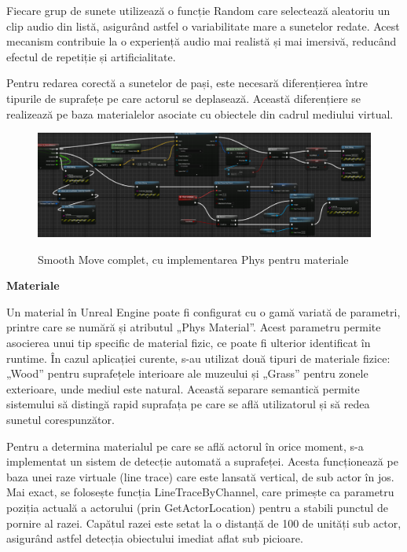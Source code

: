 Fiecare grup de sunete utilizează o funcție Random care selectează aleatoriu un clip audio din listă, asigurând astfel o variabilitate mare a sunetelor redate. Acest mecanism contribuie la o experiență audio mai realistă și mai imersivă, reducând efectul de repetiție și artificialitate.

Pentru redarea corectă a sunetelor de pași, este necesară diferențierea între tipurile de suprafețe pe care actorul se deplasează. Această diferențiere se realizează pe baza materialelor asociate cu obiectele din cadrul mediului virtual.

\begin{figure} [htp] 
\centering 
\includegraphics [width=12cm]
{continut/capitol3/figuri/Smooth_Move_Complex.png} 
\label{fig:VR_Pawn} 
    \caption{Smooth Move complet, cu implementarea Phys pentru materiale}
\end{figure}

\textbf{Materiale}

Un material în Unreal Engine poate fi configurat cu o gamă variată de parametri, printre care se numără și atributul „Phys Material”. Acest parametru permite asocierea unui tip specific de material fizic, ce poate fi ulterior identificat în runtime. În cazul aplicației curente, s-au utilizat două tipuri de materiale fizice: „Wood” pentru suprafețele interioare ale muzeului și „Grass” pentru zonele exterioare, unde mediul este natural. Această separare semantică permite sistemului să distingă rapid suprafața pe care se află utilizatorul și să redea sunetul corespunzător.

Pentru a determina materialul pe care se află actorul în orice moment, s-a implementat un sistem de detecție automată a suprafeței. Acesta funcționează pe baza unei raze virtuale (line trace) care este lansată vertical, de sub actor în jos. Mai exact, se folosește funcția LineTraceByChannel, care primește ca parametru poziția actuală a actorului (prin GetActorLocation) pentru a stabili punctul de pornire al razei. Capătul razei este setat la o distanță de 100 de unități sub actor, asigurând astfel detecția obiectului imediat aflat sub picioare.

